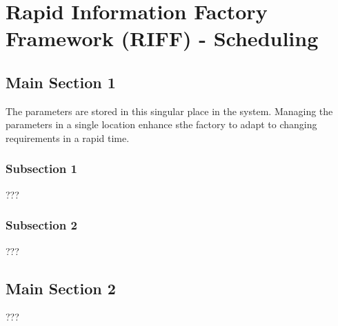
\chapter{Rapid Information Factory Framework (RIFF) - Scheduling} %

\label{Chapter25} %



\section{Main Section 1}

The parameters are stored in this singular place in the system. Managing the parameters in a single location enhance sthe factory to adapt to changing requirements in a rapid time.

\subsection{Subsection 1}

???


\subsection{Subsection 2}

???


\section{Main Section 2}

???
